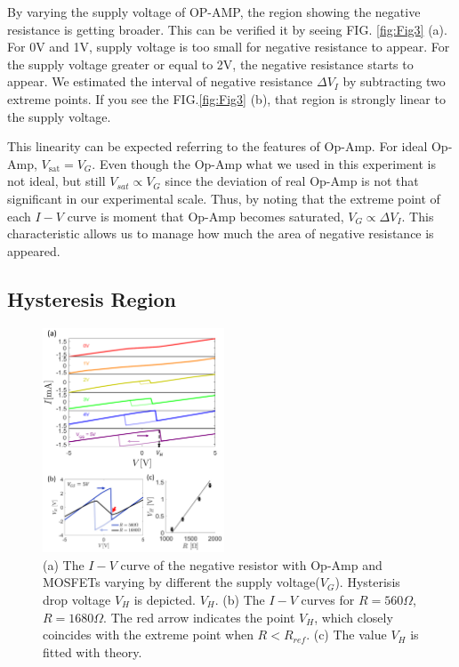 \documentclass[%
 aip,
amsmath,amssymb,
reprint,
]{revtex4-1}
\begin{document}
By varying the supply voltage of OP-AMP, the region showing the negative resistance is getting broader. This can be verified it by seeing FIG. \ref{fig:Fig3} (a). For 0V and 1V, supply voltage is too small for negative resistance to appear. For the supply voltage greater or equal to 2V, the negative resistance starts to appear. We estimated the interval of negative resistance $\Delta V_I$ by subtracting two extreme points. If you see the FIG.\ref{fig:Fig3} (b), that region is strongly linear to the supply voltage. 

This linearity can be expected referring to the features of Op-Amp.
For ideal Op-Amp, $V_{\text{sat}} = V_G$. Even though the Op-Amp what we used in this experiment is not ideal, but still $V_{sat} \propto V_G$ since the deviation of real Op-Amp is not that significant in our experimental scale. Thus, by noting that the extreme point of each $I-V$ curve is moment that Op-Amp becomes saturated, $V_G \propto \Delta V_I$. This characteristic allows us to manage how much the area of negative resistance is appeared.


\subsection{Hysteresis Region}
\begin{figure}[!h]
  \includegraphics[width=0.48\textwidth]{figures/Fig4.png}
  \caption{(a) The $I-V$ curve of the negative resistor with Op-Amp and MOSFETs varying by different the supply voltage($V_{G}$). Hysterisis drop voltage $V_H$ is depicted. $V_H$. (b) The $I-V$ curves for $R = 560\Omega$, $R = 1680\Omega$. The red arrow indicates the point $V_H$, which closely coincides with the extreme point when $R<R_{ref}$. (c) The value $V_H$ is fitted with theory.}
  \label{fig:Fig4}
\end{figure}
\end{document}
